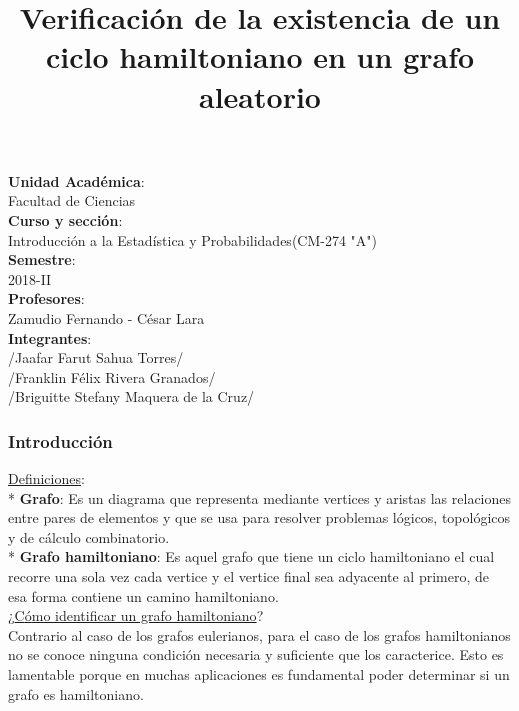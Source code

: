 \documentclass{beamer}
\title{Verificaci{\'o}n de la existencia de un ciclo hamiltoniano en un grafo aleatorio}
\date{}
\begin{document}
\begin{frame}
\begin{center}
\textbf{Unidad Acad{\'e}mica}: 
\\Facultad de Ciencias\\
\textbf{Curso y secci{\'o}n}: 
\\Introducci{\'o}n a la Estad{\'i}stica y Probabilidades(CM-274 "A")\\
\textbf{Semestre}: 
\\2018-II\\
\textbf{Profesores}:
\\ Zamudio Fernando - C{\'e}sar Lara\\
\textbf{Integrantes}:\\
/Jaafar Farut Sahua Torres/\\
/Franklin F{\'e}lix Rivera Granados/\\
/Briguitte Stefany Maquera de la Cruz/
\end{center}
\end{frame}
\begin{frame}
\titlepage
\end{frame}
\begin{frame}
\frametitle{Introducci{\'o}n}
\underline{Definiciones}:\\
* \textbf{Grafo}: Es un diagrama que representa mediante vertices y aristas las relaciones entre pares de elementos y que se usa para resolver problemas l{\'o}gicos, topol{\'o}gicos y de c{\'a}lculo combinatorio.\\
* \textbf{Grafo hamiltoniano}: Es aquel grafo que tiene un ciclo hamiltoniano el cual recorre una sola vez cada vertice y el vertice final sea adyacente al primero, de esa forma contiene un camino hamiltoniano.\\
¿\underline{C{\'o}mo identificar un grafo hamiltoniano}?\\
Contrario al caso de los grafos eulerianos, para el caso de los grafos hamiltonianos no se conoce ninguna condici{\'o}n necesaria y suficiente que los caracterice. Esto es lamentable porque en muchas aplicaciones es fundamental poder determinar si un grafo es hamiltoniano.\\
\end{frame}
\end{document}
